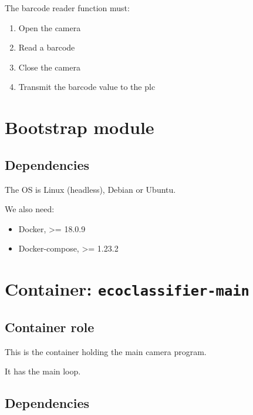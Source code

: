 The barcode reader function must:

\begin{enumerate}
    \item Open the camera
    \item Read a barcode
    \item Close the camera
    \item Transmit the barcode value to the \gls{plc}
\end{enumerate}


\section{Bootstrap module}

\subsection{Dependencies}

The OS is Linux (headless), Debian or Ubuntu.


We also need:

\begin{itemize}
    \item Docker, >= 18.0.9
    \item Docker-compose, >= 1.23.2
\end{itemize}


\section{Container: \texttt{ecoclassifier-main}}

\subsection{Container role}

This is the container holding the main camera program.

It has the main loop.

\subsection{Dependencies}


